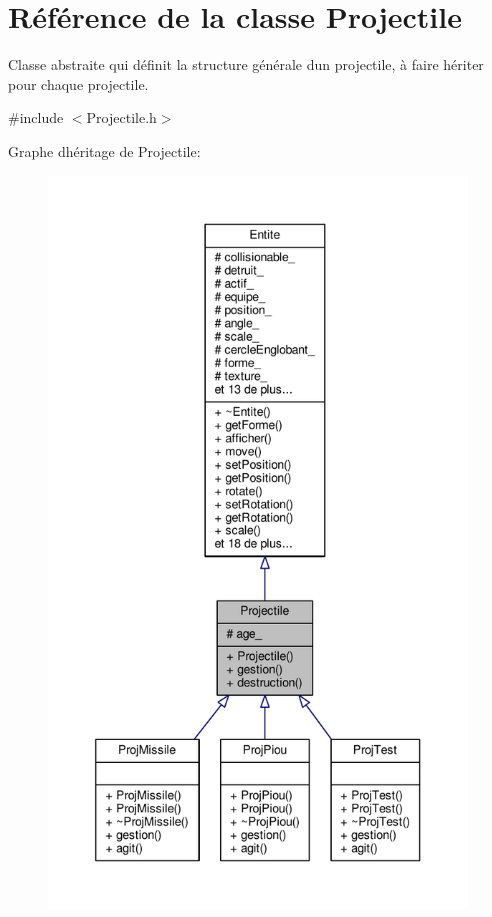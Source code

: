 \hypertarget{class_projectile}{}\section{Référence de la classe Projectile}
\label{class_projectile}


Classe abstraite qui définit la structure générale d\textquotesingle{}un projectile, à faire hériter pour chaque projectile.  




{\ttfamily \#include $<$Projectile.\+h$>$}



Graphe d\textquotesingle{}héritage de Projectile\+:\nopagebreak
\begin{figure}[H]
\begin{center}
\leavevmode
\includegraphics[height=550pt]{class_projectile__inherit__graph}
\end{center}
\end{figure}


